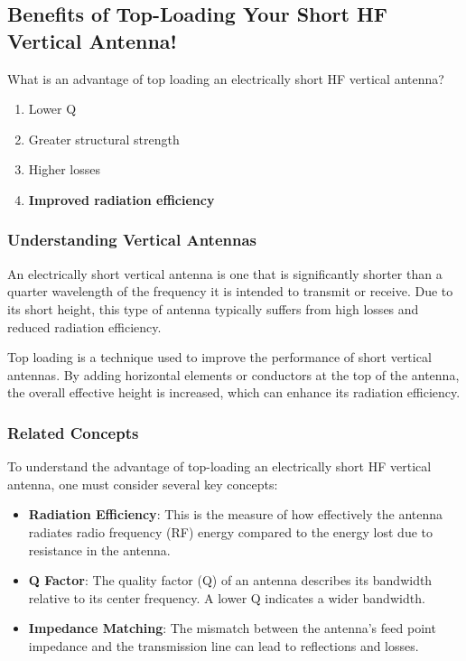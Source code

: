 \subsection{Benefits of Top-Loading Your Short HF Vertical Antenna!}

\begin{tcolorbox}[colback=gray!10, colframe=black, title=E9D07] What is an advantage of top loading an electrically short HF vertical antenna?
\begin{enumerate}[label=\Alph*.]
    \item Lower Q
    \item Greater structural strength
    \item Higher losses
    \item \textbf{Improved radiation efficiency}
\end{enumerate} \end{tcolorbox}

\subsubsection{Understanding Vertical Antennas}
An electrically short vertical antenna is one that is significantly shorter than a quarter wavelength of the frequency it is intended to transmit or receive. Due to its short height, this type of antenna typically suffers from high losses and reduced radiation efficiency. 

Top loading is a technique used to improve the performance of short vertical antennas. By adding horizontal elements or conductors at the top of the antenna, the overall effective height is increased, which can enhance its radiation efficiency. 

\subsubsection{Related Concepts}
To understand the advantage of top-loading an electrically short HF vertical antenna, one must consider several key concepts:

\begin{itemize}
    \item \textbf{Radiation Efficiency}: This is the measure of how effectively the antenna radiates radio frequency (RF) energy compared to the energy lost due to resistance in the antenna.
    \item \textbf{Q Factor}: The quality factor (Q) of an antenna describes its bandwidth relative to its center frequency. A lower Q indicates a wider bandwidth.
    \item \textbf{Impedance Matching}: The mismatch between the antenna's feed point impedance and the transmission line can lead to reflections and losses.
\end{itemize}

